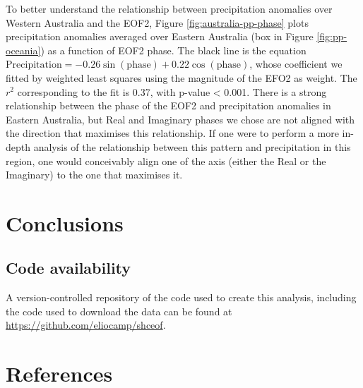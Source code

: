 \documentclass[smallextended]{svjour3}       %
\begin{document}
To better understand the relationship between precipitation anomalies over Western Australia and the EOF2, Figure \ref{fig:australia-pp-phase} plots precipitation anomalies averaged over Eastern Australia (box in Figure \ref{fig:pp-oceania}) as a function of EOF2 phase. The black line is the equation \(\mathrm{Precipitation} = -0.26\sin{(\mathrm{phase})} + 0.22\cos{(\mathrm{phase})}\), whose coefficient we fitted by weighted least squares using the magnitude of the EFO2 as weight. The \(r^2\) corresponding to the fit is 0.37, with p-value \textless{} 0.001. There is a strong relationship between the phase of the EOF2 and precipitation anomalies in Eastern Australia, but Real and Imaginary phases we chose are not aligned with the direction that maximises this relationship. If one were to perform a more in-depth analysis of the relationship between this pattern and precipitation in this region, one would conceivably align one of the axis (either the Real or the Imaginary) to the one that maximises it.



\hypertarget{conclusions}{%
\section{Conclusions}\label{conclusions}}

\hypertarget{code-availability}{%
\subsection*{Code availability}\label{code-availability}}

A version-controlled repository of the code used to create this analysis, including the code used to download the data can be found at \url{https://github.com/eliocamp/shceof}.

\hypertarget{references}{%
\section{References}\label{references}}




\end{document}
